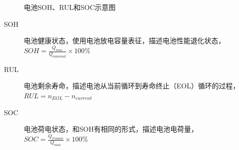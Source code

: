 \documentclass{beamer}
\begin{document}
\begin{frame}
	\begin{figure}[htbp]
		\centering
		\captionsetup{font=tiny}
		\caption{电池SOH、RUL和SOC示意图}
	\end{figure}
	\begin{description}
		\item[SOH]
			电池健康状态，使用电池放电容量表征，描述电池性能退化状态，$SOH = \frac{Q_{max}}{Q_{nominal}} \times 100\%$
		\item[RUL]
			电池剩余寿命，描述电池从当前循环到寿命终止（EOL）循环的过程，$RUL = n_{EOL} - n_{current}$
		\item[SOC]
			电池荷电状态，和SOH有相同的形式，描述电池电荷量，$SOC = \frac{Q_{remain}}{Q_{max}} \times 100\%$
	\end{description}
\end{frame}
\end{document}
